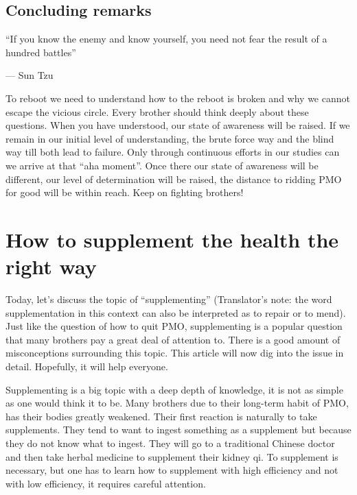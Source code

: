 \documentclass[
]{book}
\begin{document}
\hypertarget{concluding-remarks}{%
\section{Concluding remarks}\label{concluding-remarks}}

``If you know the enemy and know yourself, you need not fear the result of a hundred battles''

--- Sun Tzu

To reboot we need to understand how to the reboot is broken and why we cannot escape the vicious circle. Every brother should think deeply about these questions. When you have understood, our state of awareness will be raised. If we remain in our initial level of understanding, the brute force way and the blind way till both lead to failure. Only through continuous efforts in our studies can we arrive at that ``aha moment''. Once there our state of awareness will be different, our level of determination will be raised, the distance to ridding PMO for good will be within reach. Keep on fighting brothers!

\hypertarget{how-to-supplement-the-health-the-right-way}{%
\chapter{How to supplement the health the right way}\label{how-to-supplement-the-health-the-right-way}}

Today, let's discuss the topic of ``supplementing'' (Translator's note: the word supplementation in this context can also be interpreted as to repair or to mend). Just like the question of how to quit PMO, supplementing is a popular question that many brothers pay a great deal of attention to. There is a good amount of misconceptions surrounding this topic. This article will now dig into the issue in detail. Hopefully, it will help everyone.

Supplementing is a big topic with a deep depth of knowledge, it is not as simple as one would think it to be. Many brothers due to their long-term habit of PMO, has their bodies greatly weakened. Their first reaction is naturally to take supplements. They tend to want to ingest something as a supplement but because they do not know what to ingest. They will go to a traditional Chinese doctor and then take herbal medicine to supplement their kidney qi. To supplement is necessary, but one has to learn how to supplement with high efficiency and not with low efficiency, it requires careful attention.
\end{document}

